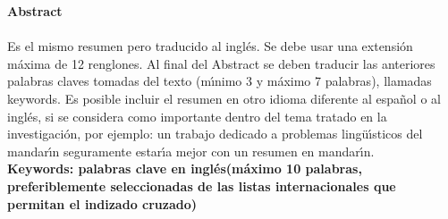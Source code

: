 \textbf{\LARGE Abstract}\\\\
Es el mismo resumen pero traducido al ingl\'{e}s. Se debe usar una extensi\'{o}n m\'{a}xima de 12 renglones. Al final del Abstract se deben traducir las anteriores palabras claves tomadas del texto (m\'{\i}nimo 3 y m\'{a}ximo 7 palabras), llamadas keywords. Es posible incluir el resumen en otro idioma diferente al espa\~{n}ol o al ingl\'{e}s, si se considera como importante dentro del tema tratado en la investigaci\'{o}n, por ejemplo: un trabajo dedicado a problemas ling\"{u}\'{\i}sticos del mandar\'{\i}n seguramente estar\'{\i}a mejor con un resumen en mandar\'{\i}n.\\[2.0cm]
\textbf{\small Keywords: palabras clave en ingl\'{e}s(m\'{a}ximo 10 palabras, preferiblemente seleccionadas de las listas internacionales que permitan el indizado cruzado)}\\
